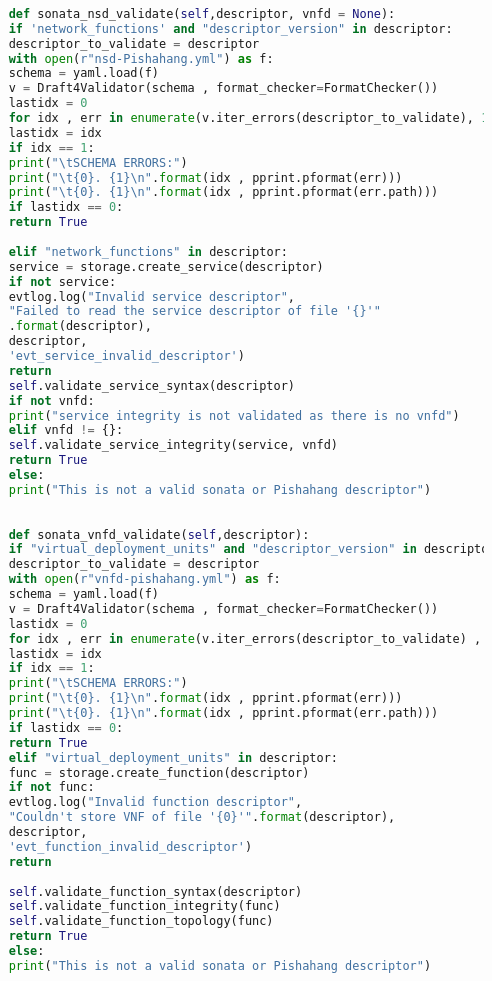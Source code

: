 \begin{lstlisting}[language=Python,caption="Validating Sonata Pishahang and OSM descriptors (Both NSD and VNFD's)", label=lis:toSOnata]
	
	def sonata_nsd_validate(self,descriptor, vnfd = None):
	if 'network_functions' and "descriptor_version" in descriptor:
	descriptor_to_validate = descriptor
	with open(r"nsd-Pishahang.yml") as f:
	schema = yaml.load(f)
	v = Draft4Validator(schema , format_checker=FormatChecker())
	lastidx = 0
	for idx , err in enumerate(v.iter_errors(descriptor_to_validate), 1):
	lastidx = idx
	if idx == 1:
	print("\tSCHEMA ERRORS:")
	print("\t{0}. {1}\n".format(idx , pprint.pformat(err)))
	print("\t{0}. {1}\n".format(idx , pprint.pformat(err.path)))
	if lastidx == 0:
	return True
	
	elif "network_functions" in descriptor:
	service = storage.create_service(descriptor)
	if not service:
	evtlog.log("Invalid service descriptor",
	"Failed to read the service descriptor of file '{}'"
	.format(descriptor),
	descriptor,
	'evt_service_invalid_descriptor')
	return
	self.validate_service_syntax(descriptor)
	if not vnfd:
	print("service integrity is not validated as there is no vnfd")
	elif vnfd != {}:
	self.validate_service_integrity(service, vnfd)
	return True
	else:
	print("This is not a valid sonata or Pishahang descriptor")
	
	
	def sonata_vnfd_validate(self,descriptor):
	if "virtual_deployment_units" and "descriptor_version" in descriptor:
	descriptor_to_validate = descriptor
	with open(r"vnfd-pishahang.yml") as f:
	schema = yaml.load(f)
	v = Draft4Validator(schema , format_checker=FormatChecker())
	lastidx = 0
	for idx , err in enumerate(v.iter_errors(descriptor_to_validate) , 1):
	lastidx = idx
	if idx == 1:
	print("\tSCHEMA ERRORS:")
	print("\t{0}. {1}\n".format(idx , pprint.pformat(err)))
	print("\t{0}. {1}\n".format(idx , pprint.pformat(err.path)))
	if lastidx == 0:
	return True
	elif "virtual_deployment_units" in descriptor:
	func = storage.create_function(descriptor)
	if not func:
	evtlog.log("Invalid function descriptor",
	"Couldn't store VNF of file '{0}'".format(descriptor),
	descriptor,
	'evt_function_invalid_descriptor')
	return
	
	self.validate_function_syntax(descriptor)
	self.validate_function_integrity(func)
	self.validate_function_topology(func)
	return True
	else:
	print("This is not a valid sonata or Pishahang descriptor")
\end{lstlisting} 

